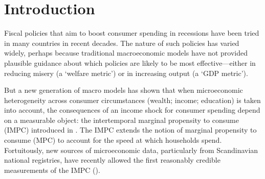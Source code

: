 \documentclass[\econtexRoot/HAFiscal]{subfiles}
\begin{document}
\hypertarget{introduction}{}\par\section{Introduction}\notinsubfile{\label{sec:intro}}
\setcounter{page}{0}

Fiscal policies that aim to boost consumer spending in recessions have been tried in many countries in recent decades.  The nature of such policies has varied widely, perhaps because traditional macroeconomic models have not provided plausible guidance about which policies are likely to be most effective---either in reducing misery (a `welfare metric') or in increasing output (a `GDP metric').

But a new generation of macro models has shown that when microeconomic heterogeneity across consumer circumstances (wealth; income; education) is taken into account, the consequences of an income shock for consumer spending depend on a measurable object: the intertemporal marginal propensity to consume (IMPC) introduced in \cite{auclert2018IKC}.  The IMPC extends the notion of marginal propensity to consume (MPC) to account for the speed at which households spend.  Fortuitously, new sources of microeconomic data, particularly from Scandinavian national registries, have recently allowed the first reasonably credible measurements of the IMPC (\cite{fagereng_mpc_2021}).
\end{document}
